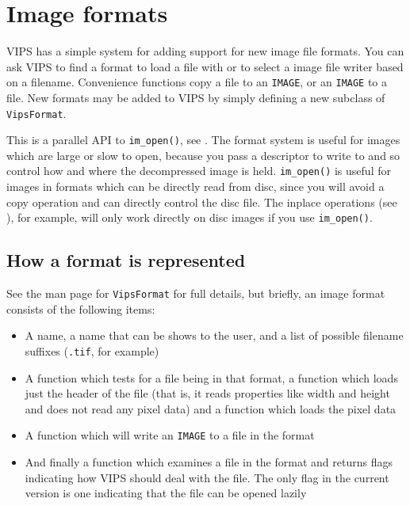 \section{Image formats}
\label{sec:format}

VIPS has a simple system for adding support for new image file formats.
You can ask VIPS to find a format to load a file with or to select a image
file writer based on a filename. Convenience functions copy a file to an
\verb+IMAGE+, or an \verb+IMAGE+ to a file. New formats may be added to
VIPS by simply defining a new subclass of \verb+VipsFormat+. 

This is a parallel API to \verb+im_open()+, see . The
format system is useful for images which are large or slow to open,
because you pass a descriptor to write to and so control how and where
the decompressed image is held. \verb+im_open()+ is useful for images in
formats which can be directly read from disc, since you will avoid a copy
operation and can directly control the disc file. The inplace operations
(see ), for example, will only work directly on disc
images if you use \verb+im_open()+.

\subsection{How a format is represented}

See the man page for \verb+VipsFormat+ for full details, but briefly, an image
format consists of the following items:

\begin{itemize}
\item
A name, a name that can be shows to the user, and a list of possible filename
suffixes (\verb+.tif+, for example)

\item
A function which tests for a file being in that format, a function which loads 
just the header of the file (that is, it reads properties like width and
height and does not read any pixel data) and a function which loads the pixel
data

\item
A function which will write an \verb+IMAGE+ to a file in the format

\item
And finally a function which examines a file in the format and returns flags
indicating how VIPS should deal with the file. The only flag in the current
version is one indicating that the file can be opened lazily

\end{itemize}

